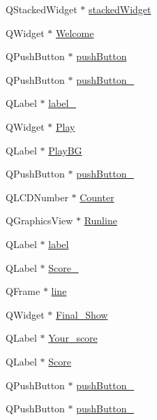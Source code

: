 \begin{DoxyCompactItemize}
\item 
Q\+Stacked\+Widget $\ast$ \hyperlink{classUi__Widget_ab3f8524a48e84bc0ff069bb0b5df5f77}{stacked\+Widget}
\item 
Q\+Widget $\ast$ \hyperlink{classUi__Widget_acd80be5365bb876d562abced34124d16}{Welcome}
\item 
Q\+Push\+Button $\ast$ \hyperlink{classUi__Widget_a7dcf5da8902069415662905e93b0d5cb}{push\+Button}
\item 
Q\+Push\+Button $\ast$ \hyperlink{classUi__Widget_a9fe3d756fb7f6586b7d1155b4234b409}{push\+Button\+\_}
\item 
Q\+Label $\ast$ \hyperlink{classUi__Widget_a6f06b143349464b5b19ac0ffe2fc084d}{label\+\_}
\item 
Q\+Widget $\ast$ \hyperlink{classUi__Widget_aeb77634a84b643c550118713f8f59259}{Play}
\item 
Q\+Label $\ast$ \hyperlink{classUi__Widget_a860e890ab515b8bfbe3c76b1e206cd5a}{Play\+BG}
\item 
Q\+Push\+Button $\ast$ \hyperlink{classUi__Widget_a7115b8e7739f8b1de7cfa289af64f26c}{push\+Button\+\_}
\item 
Q\+L\+C\+D\+Number $\ast$ \hyperlink{classUi__Widget_a749511d19eed9667d32c6c52edb3f18c}{Counter}
\item 
Q\+Graphics\+View $\ast$ \hyperlink{classUi__Widget_aee6a59815e909149f191d932ad500edd}{Runline}
\item 
Q\+Label $\ast$ \hyperlink{classUi__Widget_a3126b93450dcc18cede73b9d1ee7c6b0}{label}
\item 
Q\+Label $\ast$ \hyperlink{classUi__Widget_a612c568c4cec8a4a54457305dd69daa6}{Score\+\_}
\item 
Q\+Frame $\ast$ \hyperlink{classUi__Widget_a512183b1417a27278b56ae860e32269a}{line}
\item 
Q\+Widget $\ast$ \hyperlink{classUi__Widget_a06dc22eac2a37a21aa666a0d1db3009d}{Final\+\_\+\+Show}
\item 
Q\+Label $\ast$ \hyperlink{classUi__Widget_a7388813576eee42f6a610dd8547d4ccb}{Your\+\_\+score}
\item 
Q\+Label $\ast$ \hyperlink{classUi__Widget_a74992b395fb3b4ce486b6748f93ce58d}{Score}
\item 
Q\+Push\+Button $\ast$ \hyperlink{classUi__Widget_a55c35d62590e6ee3d87dc345fabdfbd1}{push\+Button\+\_}
\item 
Q\+Push\+Button $\ast$ \hyperlink{classUi__Widget_a3c4facd307cc5200d775ddb62b648fd4}{push\+Button\+\_}
\end{DoxyCompactItemize}


